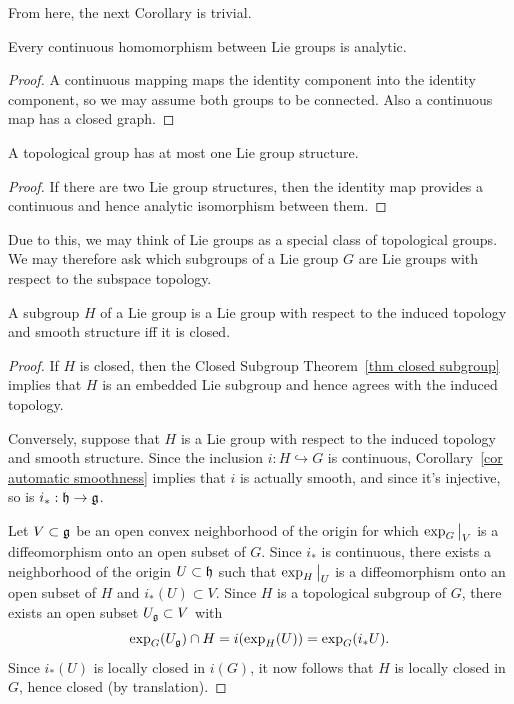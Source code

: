 From here, the next Corollary is trivial.
\begin{cor}\label{cor automatic smoothness}
    Every continuous homomorphism between Lie groups is analytic.
\end{cor}
\begin{proof}
    A continuous mapping maps the identity component into the identity component, so we may assume both groups to be connected. Also a continuous map has a closed graph.
\end{proof}
\begin{cor}
    A topological group has at most one Lie group structure.
\end{cor}
\begin{proof}
    If there are two Lie group structures, then the identity map provides a continuous and hence analytic isomorphism between them.
\end{proof}

Due to this, we may think of Lie groups as a special class of topological groups. We may therefore ask which subgroups of a Lie group $G$ are Lie groups with respect to the subspace topology.

\begin{prop}[{{\cite[Prop.~9.3.9]{HN}}}]\label{prop 9.3.9 HN}
    A subgroup $H$ of a Lie group is a Lie group with respect to the induced topology and smooth structure iff it is closed.
\end{prop}
\begin{proof}
    If $H$ is closed, then the Closed Subgroup Theorem~\ref{thm closed subgroup} implies that $H$ is an embedded Lie subgroup and hence agrees with the induced topology.

    Conversely, suppose that $H$ is a Lie group with respect to the induced topology and smooth structure. Since the inclusion $i:H\hookrightarrow G$ is continuous, Corollary~\ref{cor automatic smoothness} implies that $i$ is actually smooth, and since it's injective, so is $i_\ast:\mathfrak{h}\to\mathfrak{g}$.

    Let $V\subset \mathfrak{g}$ be an open convex neighborhood of the origin for which $\restr{\exp_G}{V}$ is a diffeomorphism onto an open subset of $G$. Since $i_\ast$ is continuous, there exists a neighborhood of the origin $U\subset \mathfrak{h}$ such that $\restr{\exp_H}{U}$ is a diffeomorphism onto an open subset of $H$ and $i_\ast (U)\subset V$. Since $H$ is a topological subgroup of $G$, there exists an open subset $U_{\mathfrak{g}}\subset V$ with
    \[\exp_G(U_{\mathfrak{g}})\cap H=i(\exp_H(U))=\exp_G(i_\ast U).\]
    Since $i_\ast(U)$ is locally closed in $i(G)$, it now follows that $H$ is locally closed in $G$, hence closed (by translation).
\end{proof}


